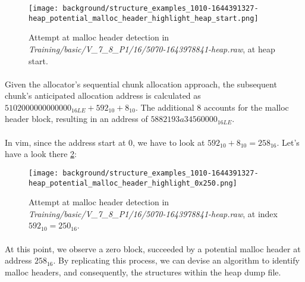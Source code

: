         \begin{figure}[H]
            \centering
            \texttt{[image: background/structure\_examples\_1010-1644391327-heap\_potential\_malloc\_header\_highlight\_heap\_start.png]}
            \caption{Attempt at malloc header detection in \textit{Training/basic/V\_7\_8\_P1/16/5070-1643978841-heap.raw}, at heap start.}
            \label{fig:methods:malloc_header_detection_heap_start}
        \end{figure}

        \paragraph{}Given the allocator's sequential chunk allocation approach, the subsequent chunk's anticipated allocation address is calculated as $ 5102000000000000_{16LE} + 592_{10} + 8_{10} $. The additional 8 accounts for the malloc header block, resulting in an address of $ 5882193a34560000_{16LE} $.
    
        \paragraph{}In vim, since the address start at 0, we have to look at $ 592_{10} + 8_{10} = 258_{16} $. Let's have a look there \ref{fig:methods:malloc_header_detection_0x250}:

        \begin{figure}[H]
            \centering
            \texttt{[image: background/structure\_examples\_1010-1644391327-heap\_potential\_malloc\_header\_highlight\_0x250.png]}
            \caption{Attempt at malloc header detection in \textit{Training/basic/V\_7\_8\_P1/16/5070-1643978841-heap.raw}, at index $ 592_{10} = 250_{16} $.}
            \label{fig:methods:malloc_header_detection_0x250}
        \end{figure}

        \paragraph{}At this point, we observe a zero block, succeeded by a potential malloc header at address $ 258_{16} $. By replicating this process, we can devise an algorithm to identify malloc headers, and consequently, the structures within the heap dump file.


